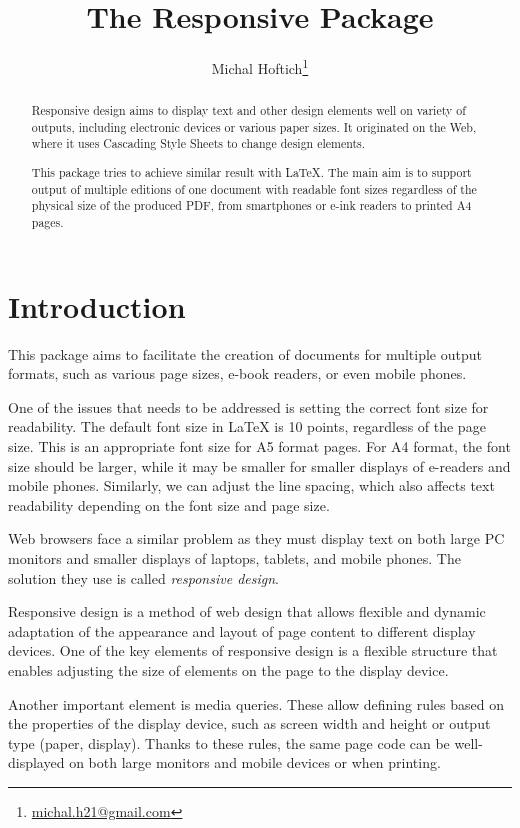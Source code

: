 \documentclass{ltxdoc}
\title{The Responsive Package}
\author{Michal Hoftich\thanks{\url{michal.h21@gmail.com}}}
\begin{document}
\maketitle
\begin{abstract}
Responsive design aims to display text and other design elements well on
variety of outputs, including electronic devices or various paper sizes.
It originated on the Web, where it uses Cascading Style Sheets to change 
design elements. 

This package tries to achieve similar result with \LaTeX. The main aim is to 
support output of multiple editions of one document with 
readable font sizes regardless of the physical size of the produced PDF,
from smartphones or e-ink readers to printed A4 pages.
\end{abstract}
\tableofcontents

\section{Introduction}

This package aims to facilitate the creation of documents for multiple output
formats, such as various page sizes, e-book readers, or even mobile phones.

One of the issues that needs to be addressed is setting the correct font size
for readability. The default font size in LaTeX is 10 points, regardless of the
page size. This is an appropriate font size for A5 format pages. For A4 format,
the font size should be larger, while it may be smaller for smaller displays of
e-readers and mobile phones. Similarly, we can adjust the line spacing, which
also affects text readability depending on the font size and page size.

Web browsers face a similar problem as they must display text on both large PC
monitors and smaller displays of laptops, tablets, and mobile phones. The
solution they use is called \textit{responsive design}.

Responsive design is a method of web design that allows flexible and dynamic
adaptation of the appearance and layout of page content to different display
devices. One of the key elements of responsive design is a flexible structure
that enables adjusting the size of elements on the page to the display device.

Another important element is media queries. These allow defining rules based on
the properties of the display device, such as screen width and height or output
type (paper, display). Thanks to these rules, the same page code can be
well-displayed on both large monitors and mobile devices or when printing. 
\end{document}
